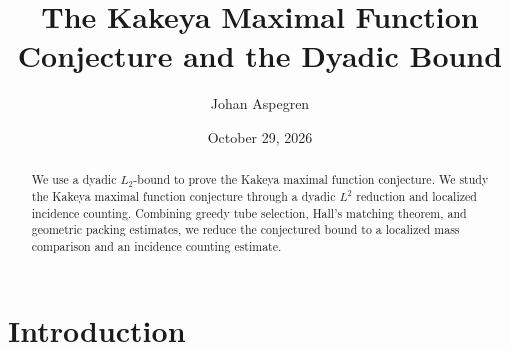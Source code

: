 \documentclass[11pt, letterpaper]{nyjm}
\title{The Kakeya Maximal Function Conjecture and the Dyadic Bound}
\author{Johan Aspegren}
\date{October 29, 2026}
\begin{document}
	
	\begin{abstract}
		We use a dyadic $L_2$-bound to prove the Kakeya maximal function conjecture. We study the Kakeya maximal function conjecture through a dyadic \(L^2\) reduction and localized incidence counting. Combining greedy tube selection, Hall's matching theorem, and geometric packing estimates, we reduce the conjectured bound to a localized mass comparison and an incidence counting estimate.  
	\end{abstract}
	
	\maketitle
	
	\tableofcontents
	
	\section{Introduction}
	
\end{document}
